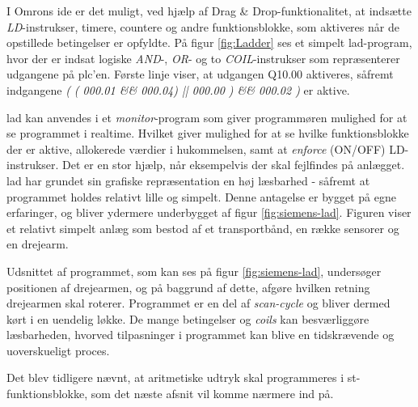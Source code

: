 I Omrons \gls{ide} er det muligt, ved hjælp af Drag \& Drop-funktionalitet, at indsætte \textit{LD}-instrukser, timere, countere og andre funktionsblokke, som aktiveres når de opstillede betingelser er opfyldte. På figur \ref{fig:Ladder} ses et simpelt \gls{lad}-program, hvor der er indsat logiske \textit{AND}-, \textit{OR}- og to \textit{COIL}-instrukser som repræsenterer udgangene på \gls{plc}'en. Første linje viser, at udgangen Q10.00 aktiveres, såfremt indgangene \textit{( ( 000.01 \&\& 000.04) || 000.00 ) \&\& 000.02 )} er aktive.


\noindent \gls{lad} kan anvendes i et \textit{monitor}-program som giver programmøren mulighed for at se programmet i realtime. Hvilket giver mulighed for at se hvilke funktionsblokke der er aktive, allokerede værdier i hukommelsen, samt at \textit{enforce} (ON/OFF) LD-instrukser. Det er en stor hjælp, når eksempelvis der skal fejlfindes på anlægget.  
\gls{lad} har grundet sin grafiske repræsentation en høj læsbarhed - såfremt at programmet holdes relativt lille og simpelt. Denne antagelse er bygget på egne erfaringer, og bliver ydermere underbygget af figur \ref{fig:siemens-lad}. Figuren viser et relativt simpelt anlæg som bestod af et transportbånd, en række sensorer og en drejearm. 


\noindent Udsnittet af programmet, som kan ses på figur \ref{fig:siemens-lad}, undersøger positionen af drejearmen, og på baggrund af dette, afgøre hvilken retning drejearmen skal roterer. Programmet er en del af \textit{scan-cycle} og bliver dermed kørt i en uendelig løkke. De mange betingelser og \textit{coils} kan besværliggøre læsbarheden, hvorved tilpasninger i programmet kan blive en tidskrævende og uoverskueligt proces.

Det blev tidligere nævnt, at aritmetiske udtryk skal programmeres i \gls{st}-funktionsblokke, som det næste afsnit vil komme nærmere ind på. 

